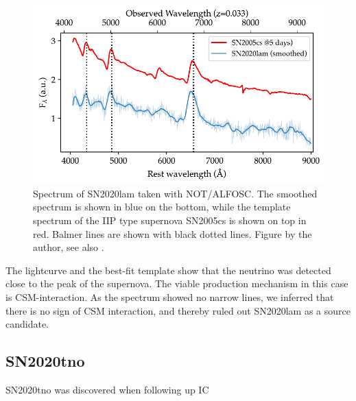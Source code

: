 \documentclass[
    a4paper, %
    fontsize=10pt, %
    twoside=true, %
    numbers=noenddot, %
    fontmethod=tex,
]{kaobook}
\begin{document}
\begin{figure}[h!]
    \includegraphics[width=1\textwidth]{fu/ZTF20abbpkpa_not_spectrum.pdf}
    \caption[SN2020lam spectrum]{Spectrum of SN2020lam taken with NOT/ALFOSC. The smoothed spectrum is shown in blue on the bottom, while the template spectrum of the IIP type supernova SN2005cs is shown on top in red. Balmer lines are shown with black dotted lines. Figure by the author, see also \cite{Stein2023a}.}
\end{figure}
The lightcurve and the best-fit template show that the neutrino was detected close to the peak of the supernova. The viable production mechanism in this case is CSM-interaction. As the spectrum showed no narrow lines, we inferred that there is no sign of CSM interaction, and thereby ruled out SN2020lam as a source candidate.

\subsection{SN2020tno}
SN2020tno was discovered when following up IC

\end{document}
